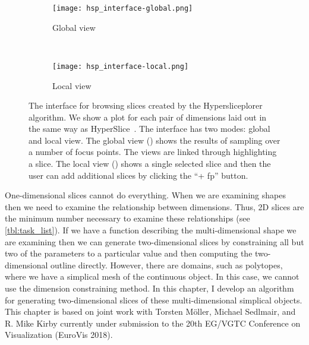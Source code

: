 
\begin{figure}
  \centering
  \begin{subfigure}[b]{0.45\linewidth}
    \texttt{[image: hsp\_interface-global.png]}
    \caption{Global view}
    \label{fig:interface:global} 
  \end{subfigure} 
  ~
  \begin{subfigure}[b]{0.45\linewidth}
    \texttt{[image: hsp\_interface-local.png]}
    \caption{Local view}
    \label{fig:interface:local} 
  \end{subfigure}
  \caption[The interface for browsing slices created by the Hypersliceplorer algorithm.]{%
    The interface for browsing slices created by the Hypersliceplorer algorithm.
    We show a plot for each pair of dimensions laid out in the same way as
    HyperSlice~\cite{Wijk:1993}.
    The interface has two modes: global and local view.
    The global view () 
    shows the results of sampling over a number of focus points. The views
    are linked through highlighting a slice. The local view 
    () shows a single selected slice and then
    the user can add additional slices by clicking the ``+ fp'' button.
  }
  \label{fig:interface}
\end{figure}

One-dimensional slices cannot do everything. When we are examining shapes then
we need to examine the relationship between dimensions. Thus, 2D slices are the
minimum number necessary to examine these relationships (see
\autoref{tbl:task_list}).  If we have a function describing the
multi-dimensional shape we are examining then we can generate two-dimensional
slices by constraining all but two of the parameters to a particular value and
then computing the two-dimensional outline directly. However, there are
domains, such as polytopes, where we have a simplical mesh of the continuous
object. In this case, we cannot use the dimension constraining method. In this
chapter, I develop an algorithm for generating two-dimensional slices of these
multi-dimensional simplical objects. 
This chapter is based on joint work with Torsten M{\"oller}, Michael Sedlmair,
and R. Mike Kirby currently under submission to the 20th EG/VGTC Conference
on Visualization (EuroVis 2018).










